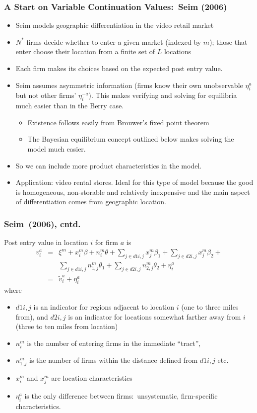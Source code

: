\begin{frame}\frametitle{A Start on Variable Continuation Values:\ Seim (2006)}
\footnotesize
\begin{itemize}
\item Seim models geographic differentiation in the video retail market
\item $N^{\ast }$ firms decide whether to enter a given market (indexed by $%
m $); those that enter choose their location from a finite set of $L$
locations
\item Each firm makes its choices based on the expected post entry value.
\item Seim assumes asymmetric information (firms know their own unobservable 
$\eta _{i}^{a}$ but not other firms' $\eta _{i}^{-a}$). This makes verifying
and solving for equilibria much easier than in the Berry case.
\begin{itemize}
\item Existence follows easily from Brouwer's fixed point theorem
\item The Bayesian equilibrium concept outlined below makes solving the
model much easier.
\end{itemize}
\item So we can include more product characteristics in the model.
\item Application: video rental stores. Ideal for this type of model because
the good is homogeneous, non-storable and relatively inexpensive and the
main aspect of differentiation comes from geographic location.
\end{itemize}
\end{frame}

\begin{frame}\frametitle{Seim\ (2006), cntd.}
\footnotesize
Post entry value in location $i$ for firm $a$ is 
\begin{eqnarray*}
v_{i}^{a} &=&\xi ^{m}+x_{i}^{m}\beta +n_{i}^{m}\theta +\sum_{j\in
d1i,j}x_{j}^{m}\beta _{1}+\sum_{j\in d2i,j}x_{j}^{m}\beta _{2}+ \\
&&\sum_{j\in d1i,j}n_{1,j}^{m}\theta _{1}+\sum_{j\in d2i,j}n_{2,j}^{m}\theta
_{2}+\eta _{i}^{a} \\
&=&\tilde{v}_{i}^{a}+\eta _{i}^{a}
\end{eqnarray*}
where
\begin{itemize}
\item $d1i,j$ is an indicator for regions adjacent to location $i$ (one to
three miles from), and $d2i,j$ is an indicator for locations somewhat
farther away from $i$ (three to ten miles from location)
\item $n_{i}^{m}$ is the number of entering firms in the immediate
\textquotedblleft tract\textquotedblright ,
\item $n_{1,j}^{m}$ is the number of firms within the distance defined from $%
d1i,j$ etc.
\item $x_{i}^{m}$ and $x_{j}^{m}$ are location characteristics
\item $\eta _{i}^{a}$ is the only difference between firms:\ unsystematic,
firm-specific characteristics.
\end{itemize}
\end{frame}

